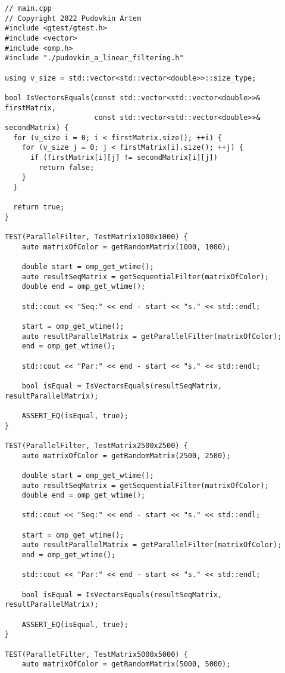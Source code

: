 \documentclass{report}
\begin{document}
\begin{lstlisting}
// main.cpp
// Copyright 2022 Pudovkin Artem
#include <gtest/gtest.h>
#include <vector>
#include <omp.h>
#include "./pudovkin_a_linear_filtering.h"

using v_size = std::vector<std::vector<double>>::size_type;

bool IsVectorsEquals(const std::vector<std::vector<double>>& firstMatrix,
                     const std::vector<std::vector<double>>& secondMatrix) {
  for (v_size i = 0; i < firstMatrix.size(); ++i) {
    for (v_size j = 0; j < firstMatrix[i].size(); ++j) {
      if (firstMatrix[i][j] != secondMatrix[i][j])
        return false;
    }
  }

  return true;
}

TEST(ParallelFilter, TestMatrix1000x1000) {
    auto matrixOfColor = getRandomMatrix(1000, 1000);

    double start = omp_get_wtime();
    auto resultSeqMatrix = getSequentialFilter(matrixOfColor);
    double end = omp_get_wtime();

    std::cout << "Seq:" << end - start << "s." << std::endl;

    start = omp_get_wtime();
    auto resultParallelMatrix = getParallelFilter(matrixOfColor);
    end = omp_get_wtime();

    std::cout << "Par:" << end - start << "s." << std::endl;

    bool isEqual = IsVectorsEquals(resultSeqMatrix, resultParallelMatrix);

    ASSERT_EQ(isEqual, true);
}

TEST(ParallelFilter, TestMatrix2500x2500) {
    auto matrixOfColor = getRandomMatrix(2500, 2500);

    double start = omp_get_wtime();
    auto resultSeqMatrix = getSequentialFilter(matrixOfColor);
    double end = omp_get_wtime();

    std::cout << "Seq:" << end - start << "s." << std::endl;

    start = omp_get_wtime();
    auto resultParallelMatrix = getParallelFilter(matrixOfColor);
    end = omp_get_wtime();

    std::cout << "Par:" << end - start << "s." << std::endl;

    bool isEqual = IsVectorsEquals(resultSeqMatrix, resultParallelMatrix);

    ASSERT_EQ(isEqual, true);
}

TEST(ParallelFilter, TestMatrix5000x5000) {
    auto matrixOfColor = getRandomMatrix(5000, 5000);


\end{lstlisting}
\end{document}
